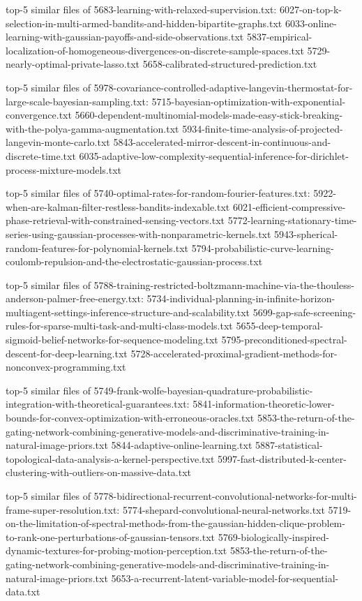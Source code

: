 \documentclass[11pt]{article}
\begin{document}
top-5 similar files of 5683-learning-with-relaxed-supervision.txt:
6027-on-top-k-selection-in-multi-armed-bandits-and-hidden-bipartite-graphs.txt
6033-online-learning-with-gaussian-payoffs-and-side-observations.txt
5837-empirical-localization-of-homogeneous-divergences-on-discrete-sample-spaces.txt
5729-nearly-optimal-private-lasso.txt
5658-calibrated-structured-prediction.txt

top-5 similar files of
5978-covariance-controlled-adaptive-langevin-thermostat-for-large-scale-bayesian-sampling.txt:
5715-bayesian-optimization-with-exponential-convergence.txt
5660-dependent-multinomial-models-made-easy-stick-breaking-with-the-polya-gamma-augmentation.txt
5934-finite-time-analysis-of-projected-langevin-monte-carlo.txt
5843-accelerated-mirror-descent-in-continuous-and-discrete-time.txt
6035-adaptive-low-complexity-sequential-inference-for-dirichlet-process-mixture-models.txt

top-5 similar files of
5740-optimal-rates-for-random-fourier-features.txt:
5922-when-are-kalman-filter-restless-bandits-indexable.txt
6021-efficient-compressive-phase-retrieval-with-constrained-sensing-vectors.txt
5772-learning-stationary-time-series-using-gaussian-processes-with-nonparametric-kernels.txt
5943-spherical-random-features-for-polynomial-kernels.txt
5794-probabilistic-curve-learning-coulomb-repulsion-and-the-electrostatic-gaussian-process.txt

top-5 similar files of
5788-training-restricted-boltzmann-machine-via-the-thouless-anderson-palmer-free-energy.txt:
5734-individual-planning-in-infinite-horizon-multiagent-settings-inference-structure-and-scalability.txt
5699-gap-safe-screening-rules-for-sparse-multi-task-and-multi-class-models.txt
5655-deep-temporal-sigmoid-belief-networks-for-sequence-modeling.txt
5795-preconditioned-spectral-descent-for-deep-learning.txt
5728-accelerated-proximal-gradient-methods-for-nonconvex-programming.txt

top-5 similar files of
5749-frank-wolfe-bayesian-quadrature-probabilistic-integration-with-theoretical-guarantees.txt:
5841-information-theoretic-lower-bounds-for-convex-optimization-with-erroneous-oracles.txt
5853-the-return-of-the-gating-network-combining-generative-models-and-discriminative-training-in-natural-image-priors.txt
5844-adaptive-online-learning.txt
5887-statistical-topological-data-analysis-a-kernel-perspective.txt
5997-fast-distributed-k-center-clustering-with-outliers-on-massive-data.txt

top-5 similar files of
5778-bidirectional-recurrent-convolutional-networks-for-multi-frame-super-resolution.txt:
5774-shepard-convolutional-neural-networks.txt
5719-on-the-limitation-of-spectral-methods-from-the-gaussian-hidden-clique-problem-to-rank-one-perturbations-of-gaussian-tensors.txt
5769-biologically-inspired-dynamic-textures-for-probing-motion-perception.txt
5853-the-return-of-the-gating-network-combining-generative-models-and-discriminative-training-in-natural-image-priors.txt
5653-a-recurrent-latent-variable-model-for-sequential-data.txt
\end{document}
